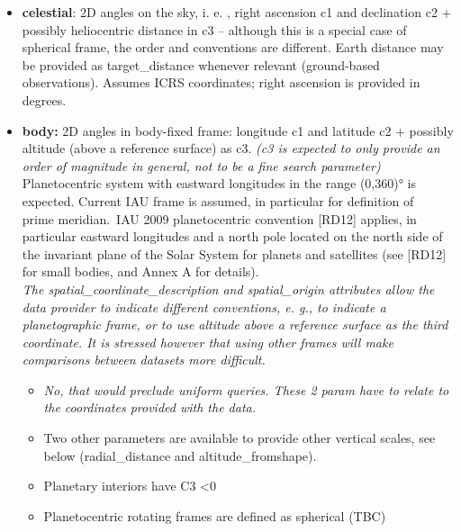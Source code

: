 \documentclass[11pt,a4paper]{ivoa}
\begin{document}
\begin{itemize}
\item \textbf{celestial}: 2D angles on the sky, i. e. , right ascension c1 and declination c2 + possibly heliocentric distance in c3 – although this is a special case of spherical frame, the order and conventions are different. Earth distance may be provided as target\_distance whenever relevant (ground-based observations). Assumes ICRS coordinates; right ascension is provided in degrees.
\item \textbf{body:} 2D angles in body-fixed frame: longitude c1 and latitude c2 + possibly altitude (above a reference surface) as c3. \emph{(c3 is expected to only provide an order of magnitude in general, not to be a fine search parameter)}\\Planetocentric system with eastward longitudes in the range (0,360)° is expected. Current IAU frame is assumed, in particular for definition of  prime meridian. IAU 2009 planetocentric convention [RD12] applies, in particular eastward longitudes and a north pole located on the north side of the invariant plane of the Solar System for planets and satellites (see [RD12] for small bodies, and Annex A for details). \emph{ }\\\emph{The spatial\_coordinate\_description and spatial\_origin attributes allow the data provider to indicate different conventions, e. g., to indicate a planetographic frame, or to use altitude above a reference surface as the third coordinate. It is stressed however that using other frames will make comparisons between datasets more difficult.}\begin{itemize}
\item \emph{No, that would preclude uniform queries. These 2 param have to relate to the coordinates provided with the data.}
\item Two other parameters are available to provide other vertical scales, see below (radial\_distance and altitude\_fromshape). 
\item Planetary interiors have C3 <0 
\item Planetocentric rotating frames are defined as spherical (TBC)
\end{itemize}



\end{itemize}
\end{document}
